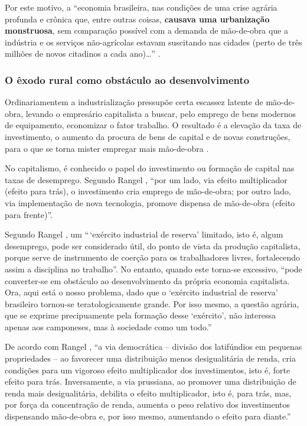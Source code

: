 \documentclass[
	12pt,				%
	oneside,			%
	a4paper,			%
	chapter=TITLE,		%
	section=TITLE,		%
	english,			%
	brazil				%
	]{abntex2}
\begin{document}
Por este motivo, a ``economia brasileira, nas condições de uma crise agrária
profunda e crônica que, entre outras coisas, \textbf{causava uma urbanização
monstruosa}, sem comparação possível com a demanda de mão-de-obra que a
indústria e os serviços não-agrícolas estavam suscitando nas cidades (perto de
três milhões de novos citadinos a cada ano)\ldots{}'' \autocite[134]{rangel1986b}.

\hypertarget{o-uxeaxodo-rural-como-obstuxe1culo-ao-desenvolvimento}{%
\subsubsection{O êxodo rural como obstáculo ao desenvolvimento}\label{o-uxeaxodo-rural-como-obstuxe1culo-ao-desenvolvimento}}
\begin{citacao}
Ordinariamentem a industrialização pressupõe certa escassez latente de 
mão-de-obra, levando o empresário capitalista a buscar, pelo emprego de bens
modernos de equipamento, economizar o fator trabalho. O resultado é a elevação 
da taxa de investimento, o aumento da procura de bens de capital e de novas
construções, para o que se torna mister empregar mais mão-de-obra 
\cite[p.~43]{rangel1962}.
\end{citacao}
No capitalismo, é conhecido o papel do investimento ou formação de capital nas
taxas de desemprego. Segundo Rangel \autocite*[156]{rangel1988}, ``por um lado, via
efeito multiplicador (efeito para trás), o investimento cria emprego de
mão-de-obra; por outro lado, via implementação de nova tecnologia, promove
dispensa de mão-de-obra (efeito para frente)''.

Segundo Rangel \autocite[142]{rangel1986c}, um ``\,`exército industrial de reserva'
limitado, isto é, algum desemprego, pode ser considerado útil, do ponto de vista
da produção capitalista, porque serve de instrumento de coerção para os
trabalhadores livres, fortalecendo assim a disciplina no trabalho''. No entanto,
quando este torna-se excessivo, ``pode converter-se em obstáculo ao
desenvolvimento da própria economia capitalista. Ora, aqui está o nosso
problema, dado que o `exército industrial de reserva' brasileiro tornou-se
teratologicamente grande. Por isso mesmo, a questão agrária, que se exprime
precipuamente pela formação desse `exército', não interessa apenas aos
camponeses, mas à sociedade como um todo.''

De acordo com Rangel \autocite*[156]{rangel1988}, ``a via democrática -- divisão dos
latifúndios em pequenas propriedades -- ao favorecer uma distribuição menos
desigualitária de renda, cria condições para um vigoroso efeito multiplicador
dos investimentos, isto é, forte efeito para trás. Inversamente, a via
prussiana, ao promover uma distribuição de renda mais desigualitária, debilita o
efeito multiplicador, isto é, para trás, mas, por força da concentração de
renda, aumenta o peso relativo dos investimentos dispensando mão-de-obra e, por
isso mesmo, aumentando o efeito para diante.''
\end{document}

